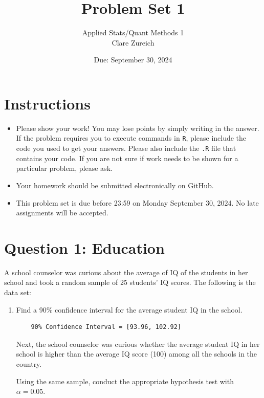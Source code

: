 \documentclass[12pt,letterpaper]{article}
\title{Problem Set 1}
\date{Due: September 30, 2024}
\author{Applied Stats/Quant Methods 1 \\ Clare Zureich}
\begin{document}
	\maketitle
	
	\section*{Instructions}
	\begin{itemize}
	\item Please show your work! You may lose points by simply writing in the answer. If the problem requires you to execute commands in \texttt{R}, please include the code you used to get your answers. Please also include the \texttt{.R} file that contains your code. If you are not sure if work needs to be shown for a particular problem, please ask.
\item Your homework should be submitted electronically on GitHub.
\item This problem set is due before 23:59 on Monday September 30, 2024. No late assignments will be accepted.
	\end{itemize}
	
	\vspace{1cm}
	\section*{Question 1: Education}

A school counselor was curious about the average of IQ of the students in her school and took a random sample of 25 students' IQ scores. The following is the data set:\\
\vspace{.5cm}

  

\vspace{1cm}

\begin{enumerate}
	\item Find a 90\% confidence interval for the average student IQ in the school.\\
	\begin{verbatim}
	90% Confidence Interval = [93.96, 102.92]
	\end{verbatim}
	
	
	
	 Next, the school counselor was curious  whether  the average student IQ in her school is higher than the average IQ score (100) among all the schools in the country.
	
	\noindent Using the same sample, conduct the appropriate hypothesis test with $\alpha=0.05$.
\end{enumerate}
\end{document}
